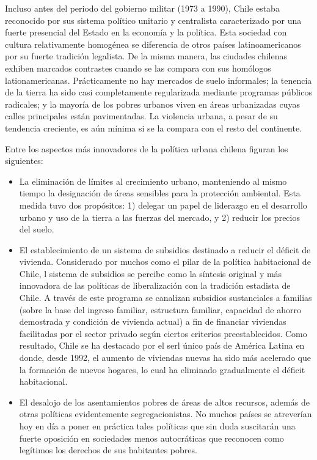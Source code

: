 Incluso antes del periodo del gobierno militar (1973 a 1990), Chile estaba reconocido por sus sistema
político unitario y centralista caracterizado por una fuerte presencial del Estado en la economía y
la política. Esta sociedad con cultura relativamente homogénea se diferencia de otros países
latinoamericanos por su fuerte tradición legalista. De la misma manera, las ciudades chilenas
exhiben marcados contrastes cuando se las compara con sus homólogos lationamericanas. Prácticamente
no hay mercados de suelo informales; la tenencia de la tierra ha sido casi completamente
regularizada mediante programas públicos radicales; y la mayoría de los pobres urbanos viven en áreas
urbanizadas cuyas calles principales están pavimentadas. La violencia urbana, a pesar de su
tendencia creciente, es aún mínima si se la compara con el resto del continente.

\textsc{}

Entre los aspectos más innovadores de la política urbana chilena figuran los siguientes:
\begin{itemize}
  \item La eliminación de límites al crecimiento urbano, manteniendo al mismo tiempo la designación
  de áreas sensibles para la protección ambiental. Esta medida tuvo dos propósitos: 1) delegar un
  papel de liderazgo en el desarrollo urbano y uso de la tierra a las fuerzas del mercado, y 2)
  reducir los precios del suelo.
  \item El establecimiento de un sistema de subsidios destinado a reducir el déficit de vivienda.
  Considerado por muchos como el pilar de la política habitacional de Chile, l sistema de subsidios
  se percibe como la síntesis original y más innovadora de las políticas de liberalización con la
  tradición estadista de Chile. A través de este programa se canalizan subsidios sustanciales a
  familias (sobre la base del ingreso familiar, estructura familiar, capacidad de ahorro demostrada
  y condición de vivienda actual) a fin de financiar viviendas facilitadas por el sector privado
  según ciertos criterios preestablecidos. Como resultado, Chile se ha destacado por el serl único
  país de América Latina en donde, desde 1992, el aumento de viviendas nuevas ha sido más acelerado
  que la formación de nuevos hogares, lo cual ha eliminado gradualmente el déficit habitacional.
  \item El desalojo de los asentamientos pobres de áreas de altos recursos, además de otras
  políticas evidentemente segregacionistas. No muchos países se atreverían hoy en día a poner en
  práctica tales políticas que sin duda suscitarán una fuerte oposición en sociedades menos
  autocráticas que reconocen como legítimos los derechos de sus habitantes pobres.
\end{itemize}

